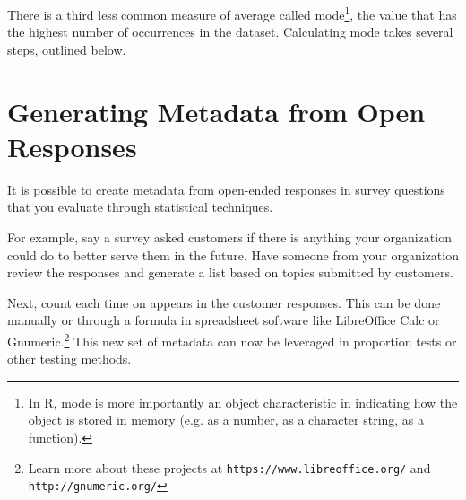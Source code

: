 There is a third less common measure of average called mode\footnote{In R, mode is more importantly an object characteristic in indicating how the object is stored in memory (e.g. as a number, as a character string, as a function).}, the value that has the highest number of occurrences in the dataset. Calculating mode takes several steps, outlined below.


\section{Generating Metadata from Open Responses}
It is possible to create metadata from open-ended responses in survey questions that you evaluate through statistical techniques.

For example, say a survey asked customers if there is anything your organization could do to better serve them in the future. Have someone from your organization review the responses and generate a list based on topics submitted by customers. 

Next, count each time on appears in the customer responses. This can be done manually or through a formula in spreadsheet software like LibreOffice Calc or Gnumeric.\footnote{Learn more about these projects at \texttt{https://www.libreoffice.org/} and \texttt{http://gnumeric.org/}} This new set of metadata can now be leveraged in proportion tests or other testing methods.
